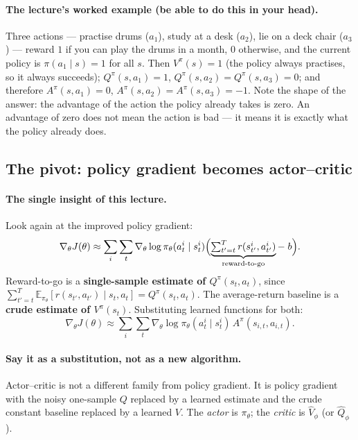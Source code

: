 \documentclass[11pt,a4paper]{article}
\begin{document}
\paragraph{The lecture's worked example (be able to do this in your head).}
Three actions --- practise drums ($a_1$), study at a desk ($a_2$), lie on a
deck chair ($a_3$) --- reward $1$ if you can play the drums in a month, $0$
otherwise, and the current policy is $\pi(a_1\mid s)=1$ for all $s$. Then
$V^\pi(s)=1$ (the policy always practises, so it always succeeds);
$Q^\pi(s,a_1)=1$, $Q^\pi(s,a_2)=Q^\pi(s,a_3)=0$; and therefore
$A^\pi(s,a_1)=0$, $A^\pi(s,a_2)=A^\pi(s,a_3)=-1$. Note the shape of the
answer: the advantage of the action the policy already takes is zero. An
advantage of zero does not mean the action is bad --- it means it is exactly
what the policy already does.

\subsection{The pivot: policy gradient becomes actor--critic}

\paragraph{The single insight of this lecture.} Look again at the improved
policy gradient:
\[
\nabla_\theta J(\theta)\approx \sum_i\sum_t \nabla_\theta\log\pi_\theta(a^i_t\mid s^i_t)
\Bigl(\underbrace{\textstyle\sum_{t'=t}^T r(s^i_{t'},a^i_{t'})}_{\text{reward-to-go}}-\;b\Bigr).
\]
Reward-to-go is a \textbf{single-sample estimate of $Q^\pi(s_t,a_t)$}, since
$\sum_{t'=t}^{T}\mathbb E_{\pi_\theta}[r(s_{t'},a_{t'})\mid s_t,a_t]=Q^\pi(s_t,a_t)$.
The average-return baseline is a \textbf{crude estimate of $V^\pi(s_t)$}.
Substituting learned functions for both:
\[
\boxed{\;\nabla_\theta J(\theta)\approx \sum_i\sum_t \nabla_\theta\log\pi_\theta(a^i_t\mid s^i_t)\,A^\pi(s_{i,t},a_{i,t}).\;}
\]

\paragraph{Say it as a substitution, not as a new algorithm.} Actor--critic is
not a different family from policy gradient. It is policy gradient with the
noisy one-sample $Q$ replaced by a learned estimate and the crude constant
baseline replaced by a learned $V$. The \emph{actor} is $\pi_\theta$; the
\emph{critic} is $\hat V_\phi$ (or $\hat Q_\phi$).
\end{document}
